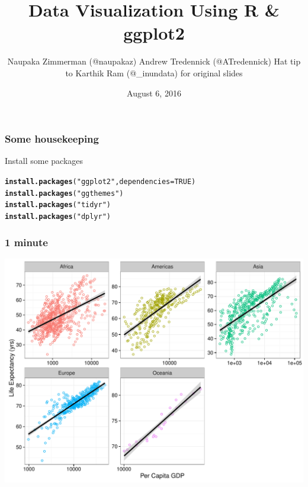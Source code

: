 \documentclass{beamer}\usepackage[]{graphicx}\usepackage[]{color}
\makeatletter
\newcommand{\hlnum}[1]{\textcolor[rgb]{0.686,0.059,0.569}{#1}}%
\newcommand{\hlstr}[1]{\textcolor[rgb]{0.192,0.494,0.8}{#1}}%
\newcommand{\hlstd}[1]{\textcolor[rgb]{0.345,0.345,0.345}{#1}}%
\newcommand{\hlkwc}[1]{\textcolor[rgb]{0.333,0.667,0.333}{#1}}%
\newcommand{\hlkwd}[1]{\textcolor[rgb]{0.737,0.353,0.396}{\textbf{#1}}}%
\newenvironment{kframe}{%
 \def\at@end@of@kframe{}%
 \ifinner\ifhmode%
  \def\at@end@of@kframe{\end{minipage}}%
  \begin{minipage}{\columnwidth}%
 \fi\fi%
 \def\FrameCommand##1{\hskip\@totalleftmargin \hskip-\fboxsep
 \colorbox{shadecolor}{##1}\hskip-\fboxsep
     \hskip-\linewidth \hskip-\@totalleftmargin \hskip\columnwidth}%
 \MakeFramed {\advance\hsize-\width
   \@totalleftmargin\z@ \linewidth\hsize
   \@setminipage}}%
 {\par\unskip\endMakeFramed%
 \at@end@of@kframe}
\newenvironment{knitrout}{}{} %
\makeatother
\begin{document}

\title{Data Visualization Using R \& ggplot2}
\author{Naupaka Zimmerman (@naupakaz) \linebreak Andrew Tredennick (@ATredennick) \linebreak \linebreak Hat tip to Karthik Ram (@\_inundata) for original slides \linebreak}
\date{August 6, 2016}
\maketitle


\begin{frame}[fragile]
\frametitle{Some housekeeping}
Install some packages
\begin{knitrout}\footnotesize
{}\color{fgcolor}\begin{kframe}
\begin{alltt}
\hlkwd{install.packages}\hlstd{(}\hlstr{"ggplot2"}\hlstd{,} \hlkwc{dependencies} \hlstd{=} \hlnum{TRUE}\hlstd{)}
\hlkwd{install.packages}\hlstd{(}\hlstr{"ggthemes"}\hlstd{)}
\hlkwd{install.packages}\hlstd{(}\hlstr{"tidyr"}\hlstd{)}
\hlkwd{install.packages}\hlstd{(}\hlstr{"dplyr"}\hlstd{)}
\end{alltt}
\end{kframe}
\end{knitrout}
\end{frame}


\begin{frame}[fragile]
\frametitle{1 minute}
\begin{knitrout}\footnotesize
{}\color{fgcolor}

{\centering \includegraphics[width=.75\linewidth]{figure/gapminder-1} 

}



\end{knitrout}
\end{frame}
\end{document}

